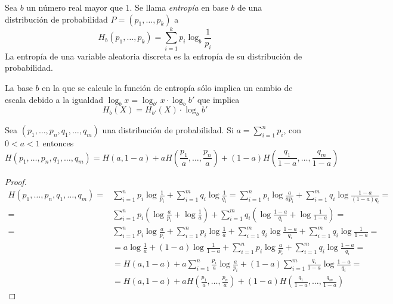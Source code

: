 \begin{df}
    Sea $b$ un número real mayor que $1$. Se llama {\it entropía} en base $b$ de una distribución de probabilidad $P=(p_1,\dots,p_k)$ a
    $$H_b(p_1,\dots,p_k)=\sum_{i=1}^kp_i\log_b\frac{1}{p_i}$$
    La entropía de una variable aleatoria discreta es la entropía de su distribución de probabilidad.
\end{df}

La base $b$ en la que se calcule la función de entropía sólo implica un cambio de escala debido a la igualdad $\log_bx=\log_{b'}x\cdot\log_bb'$ que implica
$$H_b(X)=H_{b'}(X)\cdot\log_bb'$$

\begin{prop}
    Sea $(p_1,\dots,p_n,q_1,\dots,q_m)$ una distribución de probabilidad. Si $a=\sum_{i=1}^{n}p_i$, con $0<a<1$ entonces
    $$H(p_1,\dots,p_n,q_1,\dots,q_m)=H(a, 1-a)+aH\left(\frac{p_1}{a},\dots,\frac{p_n}{a}\right)+(1-a)H\left(\frac{q_1}{1-a},\dots,\frac{q_m}{1-a}\right) $$    
\end{prop}

\begin{proof}
    \begin{equation*}
        \begin{split}
            H(p_1,\dots,p_n,q_1,\dots,q_m)=& \sum_{i=1}^np_i\log\frac{1}{p_i} + \sum_{i=1}^mq_i\log\frac{1}{q_i} = \sum_{i=1}^np_i\log\frac{a}{ap_i} + \sum_{i=1}^mq_i\log\frac{1-a}{(1-a)q_i} = \\
            =&\sum_{i=1}^np_i\left(\log\frac{a}{p_i}+\log\frac{1}{a}\right) + \sum_{i=1}^mq_i\left(\log\frac{1-a}{q_i}+\log\frac{1}{1-a}\right) = \\
            =&\sum_{i=1}^np_i\log\frac{a}{p_i} + \sum_{i=1}^np_i\log\frac{1}{a} + \sum_{i=1}^mq_i\log\frac{1-a}{q_i}+\sum_{i=1}^mq_i\log\frac{1}{1-a}=\\
            &=a\log\frac{1}{a}+(1-a)\log\frac{1}{1-a} + \sum_{i=1}^np_i\log\frac{a}{p_i} + \sum_{i=1}^mq_i\log\frac{1-a}{q_i} = \\
            &=H(a,1-a) + a\sum_{i=1}^n\frac{p_i}{a}\log\frac{a}{p_i} + (1-a)\sum_{i=1}^m\frac{q_i}{1-a}\log\frac{1-a}{q_i} = \\
            &= H(a, 1-a) +aH\left(\frac{p_1}{a},\dots,\frac{p_n}{a}\right) + (1-a)H\left(\frac{q_1}{1-a},\dots,\frac{q_m}{1-a}\right)
        \end{split}
    \end{equation*}
\end{proof}

